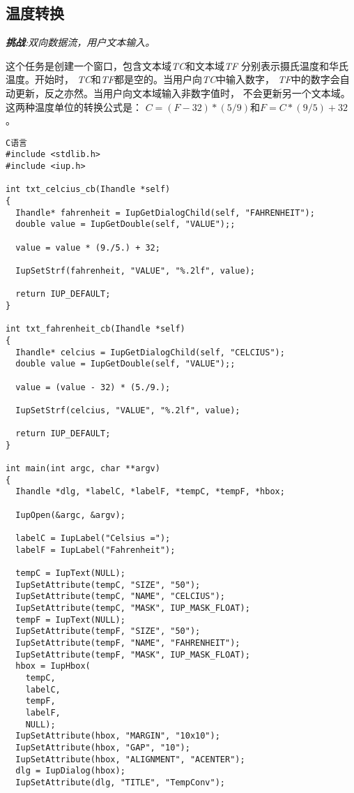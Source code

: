 \documentclass{ctexart}
\begin{document}
\subsection{温度转换}

\emph{\textbf{挑战}:双向数据流，用户文本输入。}

这个任务是创建一个窗口，包含文本域\emph{TC}和文本域\emph{TF}
分别表示摄氏温度和华氏温度。开始时，
\emph{TC}和\emph{TF}都是空的。当用户向\emph{TC}中输入数字，
\emph{TF}中的数字会自动更新，反之亦然。当用户向文本域输入非数字值时，
不会更新另一个文本域。这两种温度单位的转换公式是：
$C = (F - 32) * (5/9)$和$F = C * (9/5) + 32$。

\lstset{language=C}
\begin{lstlisting}
C语言
#include <stdlib.h>
#include <iup.h>

int txt_celcius_cb(Ihandle *self)
{
  Ihandle* fahrenheit = IupGetDialogChild(self, "FAHRENHEIT");
  double value = IupGetDouble(self, "VALUE");;

  value = value * (9./5.) + 32;

  IupSetStrf(fahrenheit, "VALUE", "%.2lf", value);

  return IUP_DEFAULT;
}

int txt_fahrenheit_cb(Ihandle *self)
{
  Ihandle* celcius = IupGetDialogChild(self, "CELCIUS");
  double value = IupGetDouble(self, "VALUE");;

  value = (value - 32) * (5./9.);

  IupSetStrf(celcius, "VALUE", "%.2lf", value);

  return IUP_DEFAULT;
}

int main(int argc, char **argv)
{
  Ihandle *dlg, *labelC, *labelF, *tempC, *tempF, *hbox;

  IupOpen(&argc, &argv);
  
  labelC = IupLabel("Celsius =");
  labelF = IupLabel("Fahrenheit");

  tempC = IupText(NULL);
  IupSetAttribute(tempC, "SIZE", "50");
  IupSetAttribute(tempC, "NAME", "CELCIUS");
  IupSetAttribute(tempC, "MASK", IUP_MASK_FLOAT);
  tempF = IupText(NULL);
  IupSetAttribute(tempF, "SIZE", "50");
  IupSetAttribute(tempF, "NAME", "FAHRENHEIT");
  IupSetAttribute(tempF, "MASK", IUP_MASK_FLOAT);
  hbox = IupHbox(
    tempC,
    labelC,
    tempF,
    labelF,
    NULL);
  IupSetAttribute(hbox, "MARGIN", "10x10");
  IupSetAttribute(hbox, "GAP", "10");
  IupSetAttribute(hbox, "ALIGNMENT", "ACENTER");
  dlg = IupDialog(hbox);
  IupSetAttribute(dlg, "TITLE", "TempConv");


\end{lstlisting}
\end{document}
